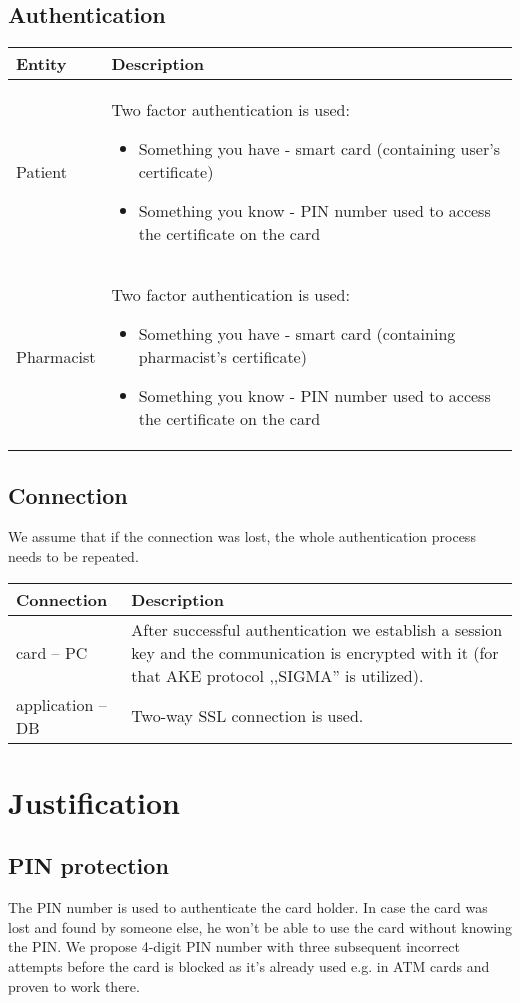 \subsection{Authentication}

\begin{longtable}{|m{3cm}|m{12cm}|}
\hline
{\bf Entity} & {\bf Description} \\ \hline
Patient & Two factor authentication is used:
\begin{itemize}
 \item Something you have - smart card (containing user's certificate)
 \item Something you know - PIN number used to access the certificate on the card
\end{itemize} \\ \hline
Pharmacist &Two factor authentication is used:
\begin{itemize}
 \item Something you have - smart card (containing pharmacist's certificate)
 \item Something you know - PIN number used to access the certificate on the card
\end{itemize} \\ \hline
\end{longtable}

\newpage

\subsection{Connection}
We assume that if the connection was lost, the whole authentication process needs to be repeated.

\begin{longtable}{|m{3cm}|m{12cm}|}
\hline
{\bf Connection} & {\bf Description} \\ \hline
card -- PC & After successful authentication we establish a session key and the communication is encrypted with it (for that AKE protocol ,,SIGMA'' is utilized). \\ \hline
application -- DB & Two-way SSL connection is used. \\ \hline
\end{longtable}

\section{Justification}

\subsection{PIN protection}
The PIN number is used to authenticate the card holder. In case the card was lost and found by someone else, he won't be able to use the card without knowing the PIN. We propose 4-digit PIN number with three subsequent incorrect attempts before the card is blocked as it's already used e.g. in ATM cards and proven to work there.

